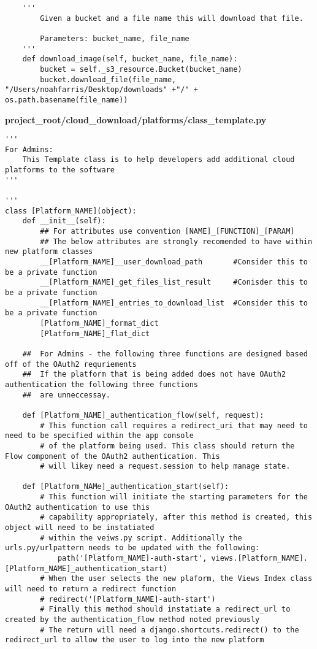 \documentclass{article}
\begin{document}
\begin{verbatim}
    '''
        Given a bucket and a file name this will download that file.

        Parameters: bucket_name, file_name
    '''
    def download_image(self, bucket_name, file_name):
        bucket = self._s3_resource.Bucket(bucket_name)
        bucket.download_file(file_name, "/Users/noahfarris/Desktop/downloads" +"/" + os.path.basename(file_name))
\end{verbatim}


\newpage
\textbf{project\_root/cloud\_download/platforms/class\_template.py}
\begin{verbatim}
'''
For Admins:
    This Template class is to help developers add additional cloud platforms to the software
'''

'''
class [Platform_NAME](object):
    def __init__(self):
        ## For attributes use convention [NAME]_[FUNCTION]_[PARAM]
        ## The below attributes are strongly recomended to have within new platform classes  
        __[Platform_NAME]__user_download_path       #Consider this to be a private function
        __[Platform_NAME]_get_files_list_result     #Conisder this to be a private function
        __[Platform_NAME]_entries_to_download_list  #Consider this to be a private function
        [Platform_NAME]_format_dict
        [Platform_NAME]_flat_dict

    ##  For Admins - the following three functions are designed based off of the OAuth2 requriements
    ##  If the platform that is being added does not have OAuth2 authentication the following three functions 
    ##  are unneccessay.

    def [Platform_NAME]_authentication_flow(self, request):
        # This function call requires a redirect_uri that may need to need to be specified within the app console 
        # of the platform being used. This class should return the Flow component of the OAuth2 authentication. This 
        # will likey need a request.session to help manage state. 

    def [Platform_NAMe]_authentication_start(self):
        # This function will initiate the starting parameters for the OAuth2 authentication to use this 
        # capability appropriately, after this method is created, this object will need to be instatiated
        # within the veiws.py script. Additionally the urls.py/urlpattern needs to be updated with the following:
            path('[Platform_NAME]-auth-start', views.[Platform_NAME].[Platform_NAME]_authentication_start)
        # When the user selects the new plaform, the Views Index class will need to return a redirect function
        # redirect('[Platform_NAME]-auth-start')
        # Finally this method should instatiate a redirect_url to created by the authentication_flow method noted previously
        # The return will need a django.shortcuts.redirect() to the redirect_url to allow the user to log into the new platform


\end{verbatim}
\end{document}
